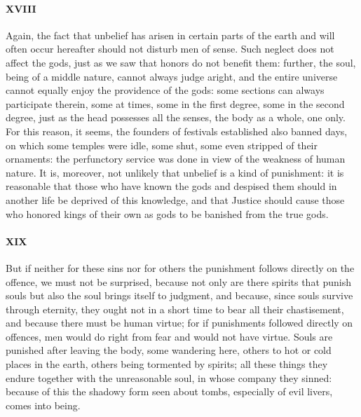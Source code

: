 \documentclass[12pt]{article}
\begin{document}
\paragraph{XVIII} Again, the fact that unbelief has arisen in certain parts of
the earth and will often occur hereafter should not disturb men of sense. Such
neglect does not affect the gods, just as we saw that honors do not benefit
them: further, the soul, being of a middle nature, cannot always judge aright,
and the entire universe cannot equally enjoy the providence of the gods: some
sections can always participate therein, some at times, some in the first
degree, some in the second degree, just as the head possesses all the senses,
the body as a whole, one only. For this reason, it seems, the founders of
festivals established also banned days, on which some temples were idle, some
shut, some even stripped of their ornaments: the perfunctory service was done
in view of the weakness of human nature. It is, moreover, not unlikely that
unbelief is a kind of punishment: it is reasonable that those who have known
the gods and despised them should in another life be deprived of this
knowledge, and that Justice should cause those who honored kings of their own
as gods to be banished from the true gods.

\paragraph{XIX} But if neither for these sins nor for others the punishment
follows directly on the offence, we must not be surprised, because not only are
there spirits that punish souls but also the soul brings itself to judgment,
and because, since souls survive through eternity, they ought not in a short
time to bear all their chastisement, and because there must be human virtue;
for if punishments followed directly on offences, men would do right from fear
and would not have virtue. Souls are punished after leaving the body, some
wandering here, others to hot or cold places in the earth, others being
tormented by spirits; all these things they endure together with the
unreasonable soul, in whose company they sinned: because of this the shadowy
form seen about tombs, especially of evil livers, comes into being.
\end{document}
